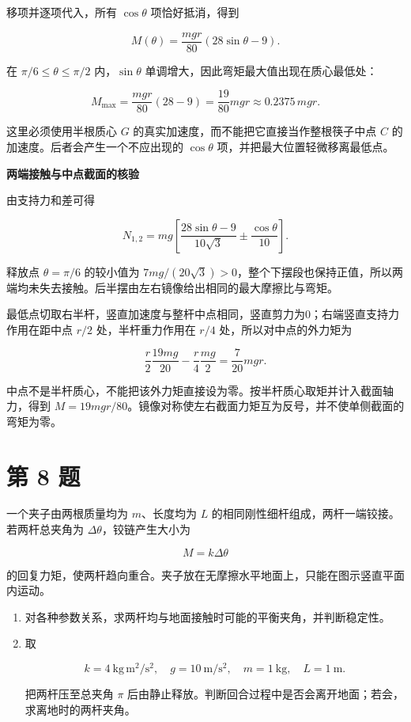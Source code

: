 \documentclass[12pt,a4paper,UTF8]{ctexart}
\begin{document}
移项并逐项代入，所有 \(\cos\theta\) 项恰好抵消，得到

\[\boxed{
M(\theta)=\frac{mgr}{80}(28\sin\theta-9)
}.\]

在 \(\pi/6\le\theta\le\pi/2\) 内，\(\sin\theta\)
单调增大，因此弯矩最大值出现在质心最低处：

\[\boxed{
M_{\max}=\frac{mgr}{80}(28-9)=\frac{19}{80}mgr
\approx0.2375\,mgr
}.\]

这里必须使用半根质心 \(G\) 的真实加速度，而不能把它直接当作整根筷子中点
\(C\) 的加速度。后者会产生一个不应出现的 \(\cos\theta\)
项，并把最大位置轻微移离最低点。

\textbf{两端接触与中点截面的核验}

由支持力和差可得

\[N_{1,2}=mg\left[\frac{28\sin\theta-9}{10\sqrt3}
\pm\frac{\cos\theta}{10}\right].\]

释放点 \(\theta=\pi/6\) 的较小值为
\(7mg/(20\sqrt3)>0\)，整个下摆段也保持正值，所以两端均未失去接触。后半摆由左右镜像给出相同的最大摩擦比与弯矩。

最低点切取右半杆，竖直加速度与整杆中点相同，竖直剪力为0；右端竖直支持力作用在距中点
\(r/2\) 处，半杆重力作用在 \(r/4\) 处，所以对中点的外力矩为

\[\frac r2\frac{19mg}{20}-\frac r4\frac{mg}{2}
=\frac7{20}mgr.\]

中点不是半杆质心，不能把该外力矩直接设为零。按半杆质心取矩并计入截面轴力，得到
\(M=19mgr/80\)。镜像对称使左右截面力矩互为反号，并不使单侧截面的弯矩为零。

\newpage

\section{第 8 题}\label{ux7b2c-8-ux9898}

一个夹子由两根质量均为 \(m\)、长度均为 \(L\)
的相同刚性细杆组成，两杆一端铰接。若两杆总夹角为
\(\Delta\theta\)，铰链产生大小为

\[M=k\Delta\theta\]

的回复力矩，使两杆趋向重合。夹子放在无摩擦水平地面上，只能在图示竖直平面内运动。

\begin{enumerate}
\def\labelenumi{\arabic{enumi}.}
\item
  对各种参数关系，求两杆均与地面接触时可能的平衡夹角，并判断稳定性。
\item
  取

  \[k=4\ \mathrm{kg\,m^2/s^2},\quad g=10\ \mathrm{m/s^2},\quad m=1\ \mathrm{kg},\quad L=1\ \mathrm m.\]

  把两杆压至总夹角 \(\pi\)
  后由静止释放。判断回合过程中是否会离开地面；若会，求离地时的两杆夹角。
\end{enumerate}
\end{document}
